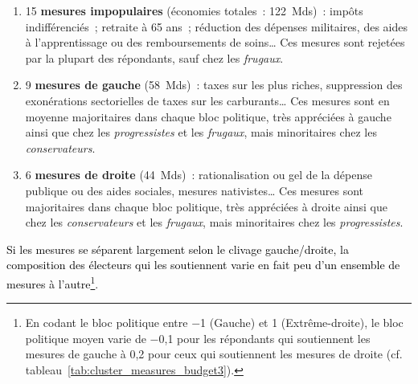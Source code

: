 \documentclass[12pt,french]{article}
\newcommand{\blue}[1]{\textcolor{black}{#1}} %
\begin{document}
\begin{enumerate}
  \item 15 \textbf{mesures impopulaires} (économies totales~: 122~Mds)~: impôts indifférenciés~; retraite à 65 ans~; réduction des dépenses militaires, des aides à l'apprentissage ou des remboursements de soins\dots{} Ces mesures sont rejetées par la plupart des répondants, sauf chez les \textit{frugaux}. 
  \item 9 \textbf{mesures de gauche} (58~Mds)~: taxes sur les plus riches, suppression des exonérations sectorielles de taxes sur les carburants\dots{} Ces mesures sont en moyenne majoritaires dans chaque bloc politique, très appréciées à gauche ainsi que chez les \textit{progressistes} et les \textit{frugaux}, mais minoritaires chez les \textit{conservateurs}.
  \item 6 \textbf{mesures de droite} (44~Mds)~: rationalisation ou gel de la dépense publique ou des aides sociales, mesures nativistes\dots{} Ces mesures sont majoritaires dans chaque bloc politique, très appréciées à droite ainsi que chez les \textit{conservateurs} et les \textit{frugaux}, mais minoritaires chez les \textit{progressistes}.
\end{enumerate}




\blue{Si les mesures se séparent largement selon le clivage gauche/droite, %
la composition des électeurs qui les soutiennent varie en fait peu d'un ensemble de mesures à l'autre}\footnote{En codant le bloc politique entre $-$1 (Gauche) et 1 (Extrême-droite), le bloc politique moyen varie de $-$0,1 pour les répondants qui soutiennent les mesures de gauche à 0,2 pour ceux qui soutiennent les mesures de droite (cf. tableau~\ref{tab:cluster_measures_budget3}).}. 
\end{document}
